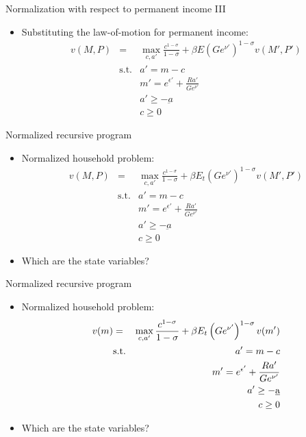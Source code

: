 \documentclass[9pt]{beamer}
\newcommand{\bit}{\begin{itemize}}
\newcommand{\eit}{\end{itemize}}
\begin{document}
\begin{frame}{Normalization with respect to permanent income III}

\bit
\setlength\itemsep{1em}

\item Substituting the law-of-motion for permanent income:
\begin{eqnarray}
v(M, P) &=& \max_{c, a'} \frac{c^{1-\sigma}}{1-\sigma} + \beta E \left(Ge^{\nu'}\right)^{1-\sigma} v(M', P') \nonumber \\
&\text{s.t.}& a' = m - c \nonumber \\
&& m' = e^{\epsilon'} + \frac{Ra'}{Ge^{\nu'}} \nonumber \\
&& a' \geq -\underbar a \nonumber \\
&& c \geq 0 \nonumber
\end{eqnarray}

\eit

\end{frame}

\begin{frame}{Normalized recursive program}

\bit
\setlength\itemsep{0.5em}

\item Normalized household problem:
\begin{eqnarray}
v(M, P) &=& \max_{c, a'} \frac{c^{1-\sigma}}{1-\sigma} + \beta E_t \left(Ge^{\nu'}\right)^{1-\sigma} v(M', P') \nonumber \\
&\text{s.t.}& a' = m - c \nonumber \\
&& m' = e^{\epsilon'} + \frac{Ra'}{Ge^{\nu'}} \nonumber \\
&& a' \geq -\underbar a \nonumber \\
&& c \geq 0 \nonumber
\end{eqnarray}

\item Which are the state variables?

\eit

\end{frame}

\begin{frame}{Normalized recursive program}

\bit
\setlength\itemsep{0.5em}

\item Normalized household problem:
\begin{eqnarray}
v({\color{black}m}) &=& \max_{c, a'} \frac{c^{1-\sigma}}{1-\sigma} + \beta E_t \left(Ge^{\nu'}\right)^{1-\sigma} v({\color{black}m'}) \nonumber \\
&\text{s.t.}& a' = m - c \nonumber \\
&& m' = e^{\epsilon'} + \frac{Ra'}{Ge^{\nu'}} \nonumber \\
&& a' \geq -\underbar a \nonumber \\
&& c \geq 0 \nonumber
\end{eqnarray}

\item Which are the state variables?

\eit

\end{frame}
\end{document}

